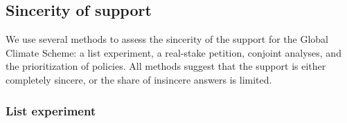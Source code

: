 \subsection{Sincerity of support}

We use several methods to assess the sincerity of the support for the Global Climate Scheme: a list experiment, a real-stake petition, conjoint analyses, and the prioritization of policies. All methods suggest that the support is either completely sincere, or the share of insincere answers is limited. 

\subsubsection{List experiment}\label{subsubsec:list_exp}  %

